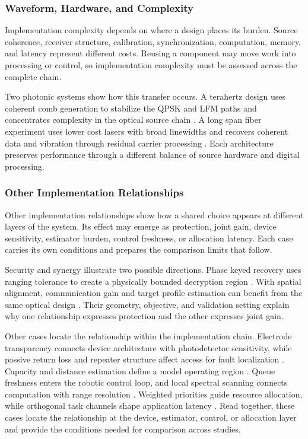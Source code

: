 \subsubsection{Waveform, Hardware, and Complexity}

Implementation complexity depends on where a design places its burden. Source
coherence, receiver structure, calibration, synchronization, computation,
memory, and latency represent different costs. Reusing a component may move
work into processing or control, so implementation complexity must be assessed
across the complete chain.

Two photonic systems show how this transfer occurs. A terahertz design uses
coherent comb generation to stabilize the QPSK and LFM paths and concentrates
complexity in the optical source chain \cite{OISAC_SCR01000}. A long span fiber
experiment uses lower cost lasers with broad linewidths and recovers coherent
data and vibration through residual carrier processing
\cite{OISAC_SCR01070}. Each architecture preserves performance through a
different balance of source hardware and digital processing.

\subsubsection{Other Implementation Relationships}

Other implementation relationships show how a shared choice appears at
different layers of the system. Its effect may emerge as protection, joint
gain, device sensitivity, estimator burden, control freshness, or allocation
latency. Each case carries its own conditions and prepares the comparison
limits that follow.

Security and synergy illustrate two possible directions. Phase keyed recovery
uses ranging tolerance to create a physically bounded decryption region
\cite{OISAC_SCR00387}. With spatial alignment, communication gain and target
profile estimation can benefit from the same optical design
\cite{OISAC_SCR00941}. Their geometry, objective, and validation setting explain
why one relationship expresses protection and the other expresses joint gain.

Other cases locate the relationship within the implementation chain. Electrode
transparency connects device architecture with photodetector sensitivity, while
passive return loss and repeater structure affect access for fault localization
\cite{OISAC_SCR00001,OISAC_SCR01100}. Capacity and distance estimation define a
model operating region \cite{OISAC_SCR00908}. Queue freshness enters the robotic
control loop, and local spectral scanning connects computation with range
resolution \cite{OISAC_SCR00910,OISAC_SCR00994}. Weighted priorities guide
resource allocation, while orthogonal task channels shape application latency
\cite{OISAC_SCR01001,OISAC_SCR01059}. Read together, these
cases locate the relationship at the device, estimator, control, or allocation
layer and provide the conditions needed for comparison across studies.

